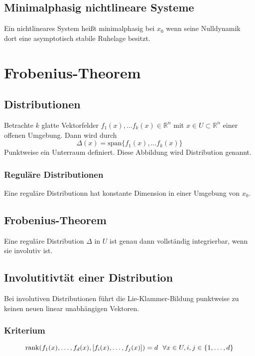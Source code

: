 \subsection{Minimalphasig nichtlineare Systeme}
Ein nichtlineares System heißt minimalphasig bei $x_0$ wenn seine Nulldynamik dort eine
asymptotisch stabile Ruhelage besitzt.

\section{Frobenius-Theorem}
\subsection{Distributionen}
Betrachte $k$ glatte Vektorfelder $f_1(x), \ldots f_k(x) \in \mathbb{R}^n$ mit 
$x \in U \subset \mathbb{R}^n$ einer offenen Umgebung. Dann wird durch
\begin{equation}
    \Delta(x) = \text{span}\{f_1(x), \ldots f_k(x)\}
\end{equation}
Punktweise ein Unterraum definiert. Diese Abbildung wird Distribution genannt.

\subsubsection{Reguläre Distributionen}
Eine reguläre Distributionn hat konstante Dimension in einer Umgebung von $x_0$.

\subsection{Frobenius-Theorem}
Eine reguläre Distribution $\Delta$ in $U$ ist genau dann vollständig integrierbar, wenn
sie involutiv ist.

\subsection{Involutitivtät einer Distribution}
Bei involutiven Distributionen führt die Lie-Klammer-Bildung punktweise zu keinen neuen
linear unabhängigen Vektoren.

\subsubsection{Kriterium}
\begin{equation}
    \operatorname*{rank}(f_1(x), \ldots, f_d(x), [f_i(x), \ldots, f_j(x)]) = d\ \ \forall x \in U, i, j \in \{1, \ldots, d\}
\end{equation}

